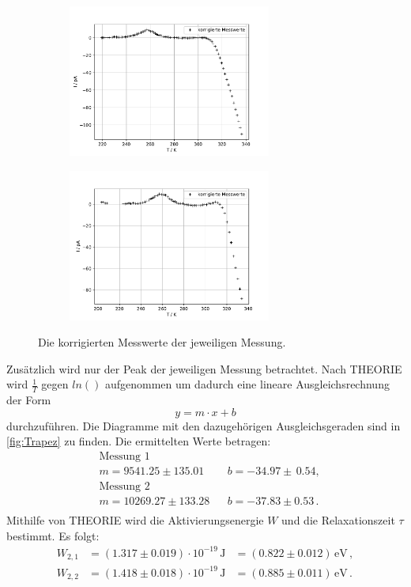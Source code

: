   \begin{figure}
    \begin{subfigure}[b]{.5\linewidth}
      \centering
      \includegraphics[height=5cm, keepaspectratio]{build/korrigierte_werte_1.pdf}
    \end{subfigure}

    \begin{subfigure}[b]{.5\linewidth}
      \centering
      \includegraphics[height=5cm, keepaspectratio]{build/korrigierte_werte_2.pdf}
    \end{subfigure}

    \caption{Die korrigierten Messwerte der jeweiligen Messung.}
    \label{fig:I_T_korrigiert}
  \end{figure} %

  \noindent
  Zusätzlich wird nur der Peak der jeweiligen Messung betrachtet.
  Nach THEORIE wird $\frac{1}{T}$ gegen $ln ()$ aufgenommen um dadurch eine lineare Ausgleichsrechnung der Form
  \begin{equation*}
    y = m \cdot x + b 
  \end{equation*}
  durchzuführen.
  Die Diagramme mit den dazugehörigen Ausgleichsgeraden sind in \autoref{fig:Trapez} zu finden.
  Die ermittelten Werte betragen:
  \begin{align*}
    &\text{Messung 1} \\
    &m = 9541.25 \pm 135.01 && b= -34.97 \pm  \, 0.54 , \\ 
    &\text{Messung 2} \\
    &m = 10269.27 \pm 133.28 && b = -37.83 \pm 0.53\, . \\
  \end{align*}
  \noindent
  Mithilfe von THEORIE wird die Aktivierungsenergie $W$ und die Relaxationszeit $\tau$ bestimmt.
  Es folgt:
  \begin{align*}
    W_{2,1} &= (1.317 \pm 0.019) \cdot 10^{-19} \, \si{\joule} &= (0.822 \pm 0.012) \, \si{\electronvolt} \, ,\\
    W_{2,2} &= (1.418 \pm 0.018) \cdot 10^{-19} \, \si{\joule} &= (0.885 \pm 0.011) \, \si{\electronvolt} \, .\\
  \end{align*}

